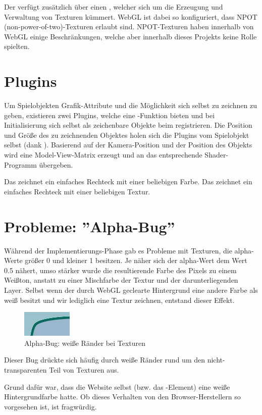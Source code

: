 Der  verfügt zusätzlich über einen , welcher sich um die Erzeugung und Verwaltung von Texturen kümmert. WebGL ist dabei so konfiguriert, dass NPOT (non-power-of-two)-Texturen erlaubt sind. NPOT-Texturen haben innerhalb von WebGL einige Beschränkungen, welche aber innerhalb dieses Projekts keine Rolle spielten.

\section{Plugins}

Um Spielobjekten Grafik-Attribute und die Möglichkeit sich selbst zu zeichnen zu geben, existieren zwei Plugins, welche eine -Funktion bieten und bei Initialisierung sich selbst als zeichenbare Objekte beim  registrieren. Die Position und Größe des zu zeichnenden Objektes holen sich die Plugins vom Spielobjekt selbst (dank ). Basierend auf der Kamera-Position und der Position des Objekts wird eine Model-View-Matrix erzeugt und an das entsprechende Shader-Programm übergeben.

Das  zeichnet ein einfaches Rechteck mit einer beliebigen Farbe. Das  zeichnet ein einfaches Rechteck mit einer beliebigen Textur.

\section{Probleme: ''Alpha-Bug''}


Während der Implementierungs-Phase gab es Probleme mit Texturen, die alpha-Werte größer 0 und kleiner 1 besitzen. Je näher sich der alpha-Wert dem Wert 0.5 nähert, umso stärker wurde die resultierende Farbe des Pixels zu einem Weißton, anstatt zu einer Mischfarbe der Textur und der darunterliegenden Layer. Selbst wenn der durch WebGL geclearte Hintergrund eine andere Farbe als weiß besitzt und wir lediglich eine Textur zeichnen, entstand dieser Effekt.

\begin{figure}[h] %
	\centering
		\includegraphics{images/alpha_bug.png}
	\caption{Alpha-Bug: weiße Ränder bei Texturen}
\end{figure}

Dieser Bug drückte sich häufig durch weiße Ränder rund um den nicht-transparenten Teil von Texturen aus.

Grund dafür war, dass die Website selbst (bzw. das -Element) eine weiße Hintergrundfarbe hatte. Ob dieses Verhalten von den Browser-Herstellern so vorgesehen ist, ist fragwürdig.